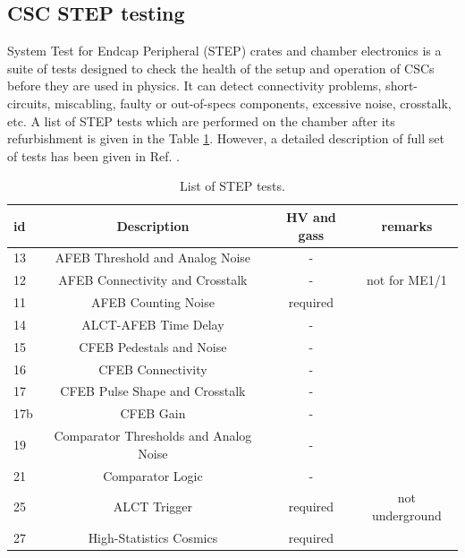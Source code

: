 \subsection{CSC STEP testing}
System Test for Endcap Peripheral (STEP) crates and chamber electronics is a suite of tests designed to check the health of the setup and operation of CSCs before they are used in physics. It can detect connectivity problems, short-circuits, miscabling, faulty or out-of-specs components, excessive noise, crosstalk, etc.
A list of STEP tests which are performed on the chamber after its refurbishment is given in the Table \ref{step_tests}. However, a detailed description of full set of tests has been given in Ref. \cite{fast_tests_full}. %



\begin{table}[!htb]
\begin{center}
    \begin{tabular}{ | l | c | c | c|}  \hline
   id &  Description      & HV  and gass & remarks        \\ \hline \hline
   13 & AFEB Threshold and Analog Noise & -  & \\  \hline
   12 & AFEB Connectivity and Crosstalk & -  & not for ME1/1 \\  \hline
   11 & AFEB Counting Noise & required &  \\  \hline
   14 & ALCT-AFEB Time Delay & - &  \\  \hline
   15 & CFEB Pedestals and Noise & -  &  \\  \hline
   16 & CFEB Connectivity & - &  \\  \hline
   17 & CFEB Pulse Shape and Crosstalk & - &  \\  \hline
   17b & CFEB Gain & - &  \\  \hline
   19 & Comparator Thresholds and Analog Noise & - &  \\  \hline
   21 & Comparator Logic & - &  \\  \hline
   25 & ALCT Trigger & required & not underground \\  \hline
   27 &	High-Statistics Cosmics & required &  \\  \hline  \hline
    \end{tabular}
    \caption{List of STEP tests.}
    \label{step_tests}
\end{center}
\end{table}

